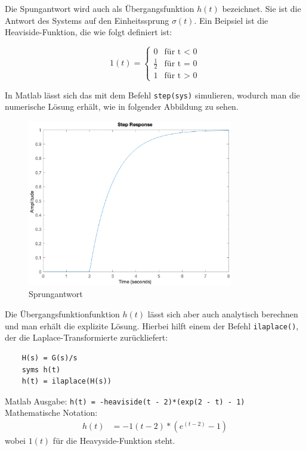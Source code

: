 Die Spungantwort wird auch als Übergangsfunktion $h(t)$ bezeichnet.
Sie ist die Antwort des Systems auf den Einheitssprung $\sigma (t)$.
Ein Beipsiel ist die Heaviside-Funktion, die wie folgt definiert ist:

\[
1 (t) = \begin{cases} 
    0 & \text{für t < 0} \\ 
    \frac{1}{2} & \text{für t = 0} \\
    1 & \text{für t > 0} \end{cases}  
\]

In Matlab lässt sich das mit dem Befehl \texttt{step(sys)} simulieren, wodurch man die numerische Lösung erhält, wie in folgender Abbildung zu sehen.

\begin{figure}[H]
    \label{fig:sprung}
    \centering
    \includegraphics[width=0.8\textwidth]{Bilder/SprungantwortPT1Tt.eps}
    \caption{Sprungantwort}
 \end{figure}

Die Übergangsfunktionfunktion $h(t)$ lässt sich aber auch analytisch berechnen und man erhält die explizite Lösung. Hierbei hilft einem der Befehl \texttt{ilaplace()}, der die Laplace-Transformierte zurückliefert:

\begin{verbatim}
    H(s) = G(s)/s
    syms h(t)
    h(t) = ilaplace(H(s))
\end{verbatim} 

Matlab Ausgabe: \texttt{h(t) = -heaviside(t - 2)*(exp(2 - t) - 1)}\\
Mathematische Notation: 
\begin{align*}
    h(t) &= -1(t-2)*(e^{(t-2)}-1)
\end{align*} wobei $1(t)$ für die Heavyside-Funktion steht.


